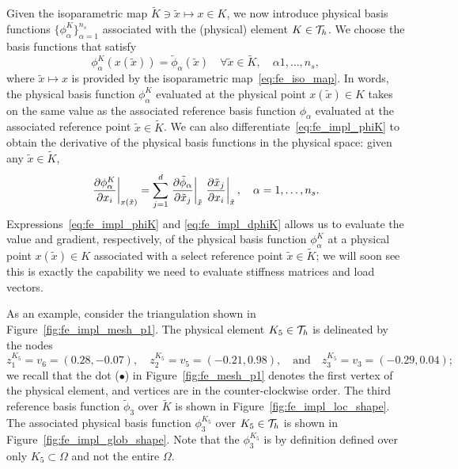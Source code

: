 Given the isoparametric map $\tilde K \ni \tilde x \mapsto x \in K$, we now introduce physical basis functions $\{ \phi^K_\alpha \}_{\alpha=1}^{n_s}$ associated with the (physical) element $K \in \mathcal{T}_h$.  We choose the basis functions that satisfy
\begin{equation}
  \phi^K_\alpha(x(\tilde x)) = \tilde \phi_\alpha(\tilde x) \quad \forall \tilde x \in \tilde K, \quad \alpha 1, \dots, n_s,
  \label{eq:fe_impl_phiK}
\end{equation}
where $\tilde x \mapsto x$ is provided by the isoparametric map~\eqref{eq:fe_iso_map}. In words, the physical basis function $\phi^K_\alpha$ evaluated at the physical point $x(\tilde x) \in K$ takes on the same value as the associated reference basis function $\phi_\alpha$ evaluated at the associated reference point $\tilde x \in \tilde K$.  
We can also differentiate~\eqref{eq:fe_impl_phiK} to obtain the derivative of the physical basis functions in the physical space: given any $\tilde x \in \tilde K$, 
\begin{equation}
  \left. \frac{\partial \phi^K_\alpha}{\partial x_i} \right|_{x(\tilde x)} =
  \sum_{j=1}^{d} \left. \frac{\partial \tilde \phi_\alpha}{\partial \tilde x_j} \right|_{\tilde x} \left. \frac{\partial \tilde x_j}{\partial x_i} \right|_{\tilde x}, \quad \alpha = 1,\dots,n_s.
  \label{eq:fe_impl_dphiK}
\end{equation}
Expressions~\eqref{eq:fe_impl_phiK} and \eqref{eq:fe_impl_dphiK} allows us to evaluate the value and gradient, respectively, of the physical basis function $\phi^K_\alpha$ at a physical point $x(\tilde x) \in K$ associated with a select reference point $\tilde x \in \tilde K$; we will soon see this is exactly the capability we need to evaluate stiffness matrices and load vectors.

As an example, consider the triangulation shown in Figure~\ref{fig:fe_impl_mesh_p1}.  The physical element $K_5 \in \mathcal{T}_h$ is delineated by the nodes
\begin{equation*}
  z^{K_5}_1 = v_6 = (0.28,-0.07), \quad 
  z^{K_5}_2 = v_5 = (-0.21,0.98), \quad \text{and} \quad
  z^{K_5}_3 = v_3 = (-0.29,0.04);
\end{equation*}
we recall that the dot ($\bullet$) in Figure~\ref{fig:fe_mesh_p1} denotes the first vertex of the physical element, and vertices are in the counter-clockwise order. The third reference basis function $\tilde \phi_3$ over $\tilde K$ is shown in Figure~\ref{fig:fe_impl_loc_shape}.  The associated physical basis function $\phi_3^{K_5}$ over $K_5 \in \mathcal{T}_h$ is shown in Figure~\ref{fig:fe_impl_glob_shape}.  Note that the $\phi_3^{K_5}$ is by definition defined over only $K_5 \subset \Omega$ and not the entire $\Omega$.

